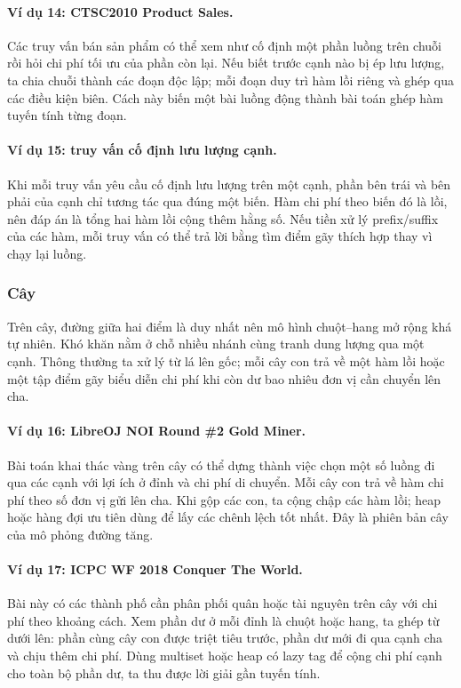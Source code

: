 \documentclass[11pt]{article}
\begin{document}
\paragraph{Ví dụ 14: CTSC2010 Product Sales.}
Các truy vấn bán sản phẩm có thể xem như cố định một phần luồng trên chuỗi rồi
hỏi chi phí tối ưu của phần còn lại. Nếu biết trước cạnh nào bị ép lưu lượng,
ta chia chuỗi thành các đoạn độc lập; mỗi đoạn duy trì hàm lồi riêng và ghép
qua các điều kiện biên. Cách này biến một bài luồng động thành bài toán ghép
hàm tuyến tính từng đoạn.

\paragraph{Ví dụ 15: truy vấn cố định lưu lượng cạnh.}
Khi mỗi truy vấn yêu cầu cố định lưu lượng trên một cạnh, phần bên trái và bên
phải của cạnh chỉ tương tác qua đúng một biến. Hàm chi phí theo biến đó là lồi,
nên đáp án là tổng hai hàm lồi cộng thêm hằng số. Nếu tiền xử lý prefix/suffix
của các hàm, mỗi truy vấn có thể trả lời bằng tìm điểm gãy thích hợp thay vì
chạy lại luồng.

\subsubsection{Cây}

Trên cây, đường giữa hai điểm là duy nhất nên mô hình chuột--hang mở rộng khá
tự nhiên. Khó khăn nằm ở chỗ nhiều nhánh cùng tranh dung lượng qua một cạnh.
Thông thường ta xử lý từ lá lên gốc; mỗi cây con trả về một hàm lồi hoặc một
tập điểm gãy biểu diễn chi phí khi còn dư bao nhiêu đơn vị cần chuyển lên cha.

\paragraph{Ví dụ 16: LibreOJ NOI Round \#2 Gold Miner.}
Bài toán khai thác vàng trên cây có thể dựng thành việc chọn một số luồng đi
qua các cạnh với lợi ích ở đỉnh và chi phí di chuyển. Mỗi cây con trả về hàm
chi phí theo số đơn vị gửi lên cha. Khi gộp các con, ta cộng chập các hàm lồi;
heap hoặc hàng đợi ưu tiên dùng để lấy các chênh lệch tốt nhất. Đây là phiên
bản cây của mô phỏng đường tăng.

\paragraph{Ví dụ 17: ICPC WF 2018 Conquer The World.}
Bài này có các thành phố cần phân phối quân hoặc tài nguyên trên cây với chi
phí theo khoảng cách. Xem phần dư ở mỗi đỉnh là chuột hoặc hang, ta ghép từ dưới
lên: phần cùng cây con được triệt tiêu trước, phần dư mới đi qua cạnh cha và
chịu thêm chi phí. Dùng multiset hoặc heap có lazy tag để cộng chi phí cạnh cho
toàn bộ phần dư, ta thu được lời giải gần tuyến tính.
\end{document}
